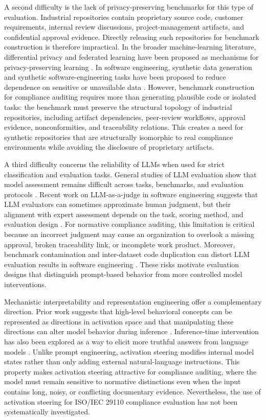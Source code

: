 \documentclass{ieeeaccess}
\begin{document}
A second difficulty is the lack of privacy-preserving benchmarks for this type of evaluation. Industrial repositories contain proprietary source code, customer requirements, internal review discussions, project-management artifacts, and confidential approval evidence. Directly releasing such repositories for benchmark construction is therefore impractical. In the broader machine-learning literature, differential privacy and federated learning have been proposed as mechanisms for privacy-preserving learning \cite{dwork2006differentialprivacy,mcmahan2017communication}. In software engineering, synthetic data generation and synthetic software-engineering tasks have been proposed to reduce dependence on sensitive or unavailable data \cite{bauer2024syntheticdata,yang2025swesmith}. However, benchmark construction for compliance auditing requires more than generating plausible code or isolated tasks: the benchmark must preserve the structural topology of industrial repositories, including artifact dependencies, peer-review workflows, approval evidence, nonconformities, and traceability relations. This creates a need for synthetic repositories that are structurally isomorphic to real compliance environments while avoiding the disclosure of proprietary artifacts.

A third difficulty concerns the reliability of LLMs when used for strict classification and evaluation tasks. General studies of LLM evaluation show that model assessment remains difficult across tasks, benchmarks, and evaluation protocols \cite{asoeollm}. Recent work on LLM-as-a-judge in software engineering suggests that LLM evaluators can sometimes approximate human judgment, but their alignment with expert assessment depends on the task, scoring method, and evaluation design \cite{cllmrheaesllmis,ICLR2025_7f8f7313}. For normative compliance auditing, this limitation is critical because an incorrect judgment may cause an organization to overlook a missing approval, broken traceability link, or incomplete work product. Moreover, benchmark contamination and inter-dataset code duplication can distort LLM evaluation results in software engineering \cite{hernandez2024codeduplication,zhou2025lessleak}. These risks motivate evaluation designs that distinguish prompt-based behavior from more controlled model interventions.

Mechanistic interpretability and representation engineering offer a complementary direction. Prior work suggests that high-level behavioral concepts can be represented as directions in activation space and that manipulating these directions can alter model behavior during inference \cite{zou2023representation,turner2023activation}. Inference-time intervention has also been explored as a way to elicit more truthful answers from language models \cite{li2023iti}. Unlike prompt engineering, activation steering modifies internal model states rather than only adding external natural-language instructions. This property makes activation steering attractive for compliance auditing, where the model must remain sensitive to normative distinctions even when the input contains long, noisy, or conflicting documentary evidence. Nevertheless, the use of activation steering for ISO/IEC 29110 compliance evaluation has not been systematically investigated.
\end{document}
